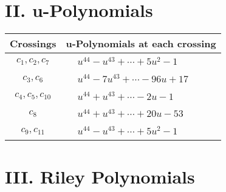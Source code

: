\documentclass[1p]{elsarticle_modified}
\theoremstyle{definition}
\begin{document}
\newpage\renewcommand{\arraystretch}{1}
\centering \section*{ II. u-Polynomials}
\begin{tabular}{m{50pt}|m{274pt}}
Crossings & \hspace{64pt}u-Polynomials at each crossing \\
\hline $$\begin{aligned}c_{1},c_{2},c_{7}\end{aligned}$$&$\begin{aligned}
&u^{44}- u^{43}+\cdots+5 u^2-1
\end{aligned}$\\
\hline $$\begin{aligned}c_{3},c_{6}\end{aligned}$$&$\begin{aligned}
&u^{44}-7 u^{43}+\cdots-96 u+17
\end{aligned}$\\
\hline $$\begin{aligned}c_{4},c_{5},c_{10}\end{aligned}$$&$\begin{aligned}
&u^{44}+u^{43}+\cdots-2 u-1
\end{aligned}$\\
\hline $$\begin{aligned}c_{8}\end{aligned}$$&$\begin{aligned}
&u^{44}+u^{43}+\cdots+20 u-53
\end{aligned}$\\
\hline $$\begin{aligned}c_{9},c_{11}\end{aligned}$$&$\begin{aligned}
&u^{44}- u^{43}+\cdots+5 u^2-1
\end{aligned}$\\
\hline
\end{tabular}\newpage\renewcommand{\arraystretch}{1}
\centering \section*{ III. Riley Polynomials}
\end{document}
